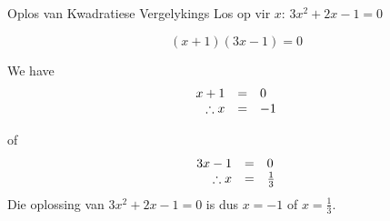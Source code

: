         
\begin{wex}
{Oplos van Kwadratiese Vergelykings }
{Los op vir $x$: $3{x}^{2}+2x-1=0$}
{

\begin{equation*}
(x+1)(3x-1)=0
\end{equation*}

We have
\begin{equation*}
     \begin{array}{ccc}\hfill x+1&=&0\hfill \\
	\hfill \therefore x&=&-1
    \end{array}
\end{equation*}

of
\begin{equation*}
     \begin{array}{ccc}\hfill 3x-1&=&0\hfill \\
	\hfill \therefore x&=&\frac{1}{3}
    \end{array}
\end{equation*}
Die oplossing van $3{x}^{2}+2x-1=0$ is dus $x=-1$ of $x=\frac{1}{3}$.
}
\end{wex}


